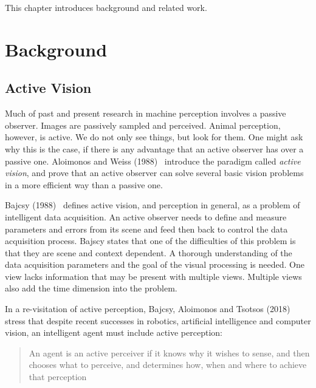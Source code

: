 This chapter introduces background and related work.


\section{Background}

\subsection{Active Vision}


Much of past and present research in machine perception involves a passive observer.
Images are passively sampled and perceived.
Animal perception, however, is active.
We do not only see things, but look for them.
One might ask why this is the case, if there is any advantage that an active observer has over a passive one.
Aloimonos and Weiss (1988)~\cite{aloimonos_active_1988} introduce the paradigm called \textit{active vision}, and prove that an active observer can solve several basic vision problems in a more efficient way than a passive one.

Bajcsy (1988)~\cite{bajcsy_1988} defines active vision, and perception in general, as a problem of intelligent data acquisition.
An active observer needs to define and measure parameters and errors from its scene and feed then back to control the data acquisition process.
Bajscy states that one of the difficulties of this problem is that they are scene and context dependent.
A thorough understanding of the data acquisition parameters and the goal of the visual processing is needed.
One view lacks information that may be present with multiple views.
Multiple views also add the time dimension into the problem.

In a re-visitation of active perception, Bajcsy, Aloimonos and Tsotsos (2018)~\cite{bajcsy_aloimonos_tsotsos_2018} stress that despite recent successes in robotics, artificial intelligence and computer vision, an intelligent agent must include active perception:

\begin{quote}
    An agent is an active perceiver if it knows why it wishes to sense, and then chooses what to perceive, and determines how, when and where to achieve that perception
\end{quote}~\cite{bajcsy_aloimonos_tsotsos_2018}

